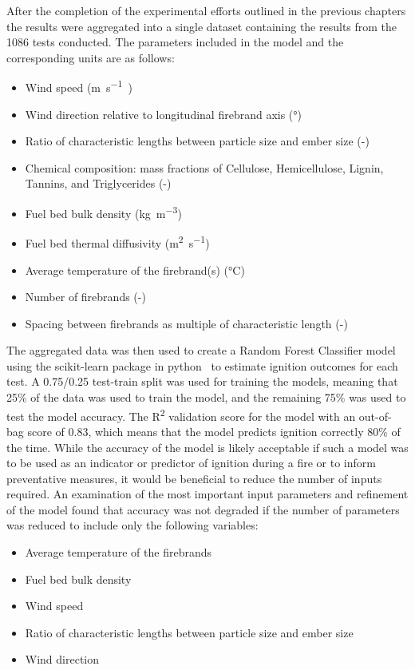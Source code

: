     After the completion of the experimental efforts outlined in the previous chapters the results were aggregated into a single dataset containing the results from the 1086 tests conducted. The parameters included in the model and the corresponding units are as follows:
        \begin{itemize}
            \item Wind speed (\si{\meter\per\second)}
            \item Wind direction relative to longitudinal firebrand axis (\si{\degree})
            \item Ratio of characteristic lengths between particle size and ember size (-)
            \item Chemical composition: mass fractions of Cellulose, Hemicellulose, Lignin, Tannins, and Triglycerides (-)
            \item Fuel bed bulk density (\si{\kilo\gram\per\cubic\meter})
            \item Fuel bed thermal diffusivity (\si{\square\meter\per\second})
            \item Average temperature of the firebrand(s) (\si{\celsius})
            \item Number of firebrands (-)
            \item Spacing between firebrands as multiple of characteristic length (-)
        \end{itemize}
    The aggregated data was then used to create a Random Forest Classifier model using the scikit-learn package in python~\cite{scikit-learn} to estimate ignition outcomes for each test. A 0.75/0.25 test-train split was used for training the models, meaning that 25\% of the data was used to train the model, and the remaining 75\% was used to test the model accuracy. The R\textsuperscript{2} validation score for the model with an out-of-bag score of 0.83, which means that the model predicts ignition correctly 80\% of the time. While the accuracy of the model is likely acceptable if such a model was to be used as an indicator or predictor of ignition during a fire or to inform preventative measures, it would be beneficial to reduce the number of inputs required. An examination of the most important input parameters and refinement of the model found that accuracy was not degraded if the number of parameters was reduced to include only the following variables:
        \begin{itemize}
            \item Average temperature of the firebrands
            \item Fuel bed bulk density
            \item Wind speed
            \item Ratio of characteristic lengths between particle size and ember size
            \item Wind direction
        \end{itemize}
